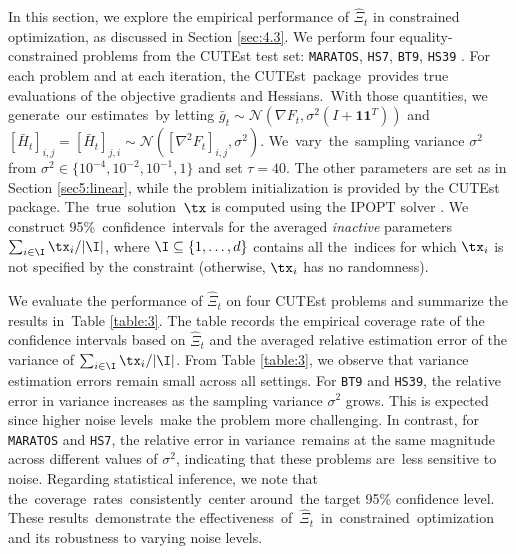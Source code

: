 In this section, we explore the empirical performance of $\hat{\Xi}_t$ in constrained optimization, as discussed in Section \ref{sec:4.3}. We perform four equality-constrained problems from the CUTEst test set: \texttt{MARATOS}, \texttt{HS7}, \texttt{BT9}, \texttt{HS39} \citep{Gould2014CUTEst}. 
For each problem and at each iteration, the CUTEst~\mbox{package}~\mbox{provides} true evaluations of the objective gradients and Hessians.~With those quantities, we generate~our {estimates}~by letting  $\bar{g}_t\sim \mathcal{N}(\nabla F_t, \sigma^2(I+\boldsymbol{1}\boldsymbol{1}^T))$ and $[\bar{H}_t]_{i,j} =[\bar{H}_t]_{j,i} \sim \mathcal{N}([\nabla^2 F_t]_{i,j}, \sigma^2)$. We~vary~the~sampling variance $\sigma^2$ from $\sigma^2\in\{10^{-4}, 10^{-2}, 10^{-1}, 1\}$ and set $\tau = 40$. The other parameters are set as in Section \ref{sec5:linear}, while the problem initialization is provided by the CUTEst package. The~true~solution~$\tx$ is computed using the IPOPT solver \citep{Waechter2005implementation}. We construct 95\%~confidence~intervals for the averaged \textit{inactive} parameters $\sum_{i\in\I}\tx_i/|\I|$, where $\I\subseteq\{1,\ldots,d\}$ contains all the~indices for which $\tx_i$ is not specified by the constraint (otherwise, $\tx_i$ has no randomness).



We evaluate the performance of $\hat{\Xi}_t$ on four CUTEst problems and summarize the results in~Table \ref{table:3}. The table records the empirical coverage rate of the confidence intervals based on $\hat{\Xi}_t$ and the averaged relative estimation error of the variance of $\sum_{i\in\I}\tx_i/|\I|$.
From Table \ref{table:3}, we observe that variance estimation errors remain small across all settings. For \texttt{BT9} and \texttt{HS39}, the relative error in variance increases as the sampling variance $\sigma^2$ grows. This is expected since higher noise levels~make the problem more challenging. In contrast, for \texttt{MARATOS} and \texttt{HS7}, the relative error in variance~remains at the same magnitude across different values of $\sigma^2$, indicating that these problems are~less sensitive to noise. Regarding statistical inference, we note that the~coverage~rates~consistently~center around~the target 95\% confidence level. These results~demonstrate the effectiveness~of~$\hat{\Xi}_t$~in~constrained~optimization and its robustness to varying noise levels.




